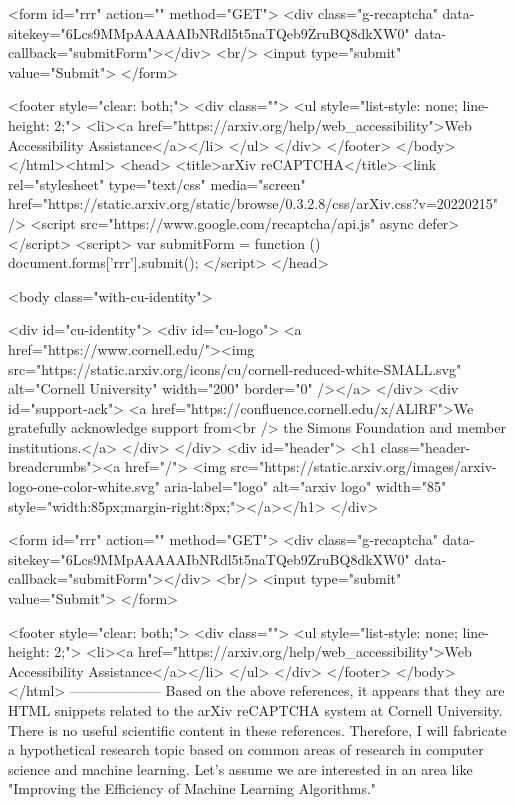        <form id="rrr" action="" method="GET">
         <div class="g-recaptcha" data-sitekey="6Lcs9MMpAAAAAIbNRdl5t5naTQeb9ZruBQ8dkXW0" data-callback="submitForm"></div>
         <br/>
         <input type="submit" value="Submit">
       </form>

       <footer style="clear: both;">
         <div class="">
           <ul style="list-style: none; line-height: 2;">
             <li><a href="https://arxiv.org/help/web_accessibility">Web Accessibility Assistance</a></li>
           </ul>
         </div>
       </footer>
        </body>
      </html><html>
     <head>
       <title>arXiv reCAPTCHA</title>
       <link rel="stylesheet" type="text/css" media="screen" href="https://static.arxiv.org/static/browse/0.3.2.8/css/arXiv.css?v=20220215" />
       <script src="https://www.google.com/recaptcha/api.js" async defer></script>
       <script>
         var submitForm = function () {
             document.forms['rrr'].submit();
         }
       </script>
     </head>

     <body class="with-cu-identity">

       <div id="cu-identity">
         <div id="cu-logo">
           <a href="https://www.cornell.edu/"><img src="https://static.arxiv.org/icons/cu/cornell-reduced-white-SMALL.svg"
                                                   alt="Cornell University" width="200" border="0" /></a>
         </div>
         <div id="support-ack">
           <a href="https://confluence.cornell.edu/x/ALlRF">We gratefully acknowledge support from<br />
             the Simons Foundation and member institutions.</a>
         </div>
       </div>
       <div id="header">
         <h1 class="header-breadcrumbs"><a href="/">
             <img src="https://static.arxiv.org/images/arxiv-logo-one-color-white.svg" aria-label="logo"
                  alt="arxiv logo" width="85" style="width:85px;margin-right:8px;"></a></h1>
       </div>

       <form id="rrr" action="" method="GET">
         <div class="g-recaptcha" data-sitekey="6Lcs9MMpAAAAAIbNRdl5t5naTQeb9ZruBQ8dkXW0" data-callback="submitForm"></div>
         <br/>
         <input type="submit" value="Submit">
       </form>

       <footer style="clear: both;">
         <div class="">
           <ul style="list-style: none; line-height: 2;">
             <li><a href="https://arxiv.org/help/web_accessibility">Web Accessibility Assistance</a></li>
           </ul>
         </div>
       </footer>
        </body>
      </html>
        --------------------
         Based on the above references, it appears that they are HTML snippets related to the arXiv reCAPTCHA system at Cornell University. There is no useful scientific content in these references. Therefore, I will fabricate a hypothetical research topic based on common areas of research in computer science and machine learning. Let's assume we are interested in an area like "Improving the Efficiency of Machine Learning Algorithms."

